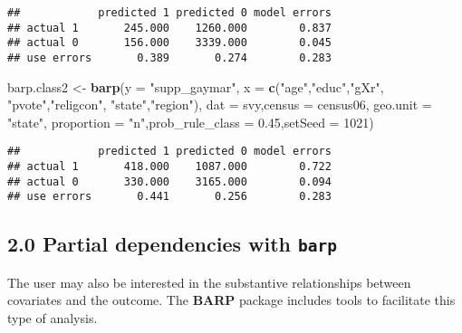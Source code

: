 \documentclass[]{article}
\newenvironment{Shaded}{\begin{snugshade}}{\end{snugshade}}
\newcommand{\KeywordTok}[1]{\textcolor[rgb]{0.13,0.29,0.53}{\textbf{#1}}}
\newcommand{\DataTypeTok}[1]{\textcolor[rgb]{0.13,0.29,0.53}{#1}}
\newcommand{\DecValTok}[1]{\textcolor[rgb]{0.00,0.00,0.81}{#1}}
\newcommand{\FloatTok}[1]{\textcolor[rgb]{0.00,0.00,0.81}{#1}}
\newcommand{\StringTok}[1]{\textcolor[rgb]{0.31,0.60,0.02}{#1}}
\newcommand{\OperatorTok}[1]{\textcolor[rgb]{0.81,0.36,0.00}{\textbf{#1}}}
\newcommand{\NormalTok}[1]{#1}
\begin{document}
\begin{verbatim}
##            predicted 1 predicted 0 model errors
## actual 1       245.000    1260.000        0.837
## actual 0       156.000    3339.000        0.045
## use errors       0.389       0.274        0.283
\end{verbatim}

\begin{Shaded}
\begin{Highlighting}[]
\NormalTok{barp.class2 <-}\StringTok{ }\KeywordTok{barp}\NormalTok{(}\DataTypeTok{y =} \StringTok{"supp_gaymar"}\NormalTok{,}
                 \DataTypeTok{x =} \KeywordTok{c}\NormalTok{(}\StringTok{"age"}\NormalTok{,}\StringTok{"educ"}\NormalTok{,}\StringTok{"gXr"}\NormalTok{,}
                       \StringTok{"pvote"}\NormalTok{,}\StringTok{"religcon"}\NormalTok{,}
                       \StringTok{"state"}\NormalTok{,}\StringTok{"region"}\NormalTok{),}
                 \DataTypeTok{dat =}\NormalTok{ svy,}\DataTypeTok{census =}\NormalTok{ census06,}
                 \DataTypeTok{geo.unit =} \StringTok{"state"}\NormalTok{,}
                 \DataTypeTok{proportion =} \StringTok{"n"}\NormalTok{,}\DataTypeTok{prob_rule_class =} \FloatTok{0.45}\NormalTok{,}\DataTypeTok{setSeed =} \DecValTok{1021}\NormalTok{)}
\end{Highlighting}
\end{Shaded}

\begin{Shaded}
\end{Shaded}

\begin{verbatim}
##            predicted 1 predicted 0 model errors
## actual 1       418.000    1087.000        0.722
## actual 0       330.000    3165.000        0.094
## use errors       0.441       0.256        0.283
\end{verbatim}

\subsection{\texorpdfstring{2.0 Partial dependencies with
\texttt{barp}}{2.0 Partial dependencies with barp}}\label{partial-dependencies-with-barp}

The user may also be interested in the substantive relationships between
covariates and the outcome. The \textbf{BARP} package includes tools to
facilitate this type of analysis.
\end{document}

